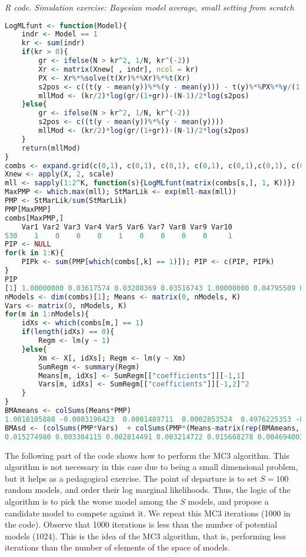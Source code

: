 \begin{tcolorbox}[enhanced,width=4.67in,center upper,
	fontupper=\large\bfseries,drop shadow southwest,sharp corners]
	\textit{R code. Simulation exercise: Bayesian model average, small setting from scratch}
	\begin{VF}
		\begin{lstlisting}[language=R]
LogMLfunt <- function(Model){
	indr <- Model == 1
	kr <- sum(indr)
	if(kr > 0){
		gr <- ifelse(N > kr^2, 1/N, kr^(-2))
		Xr <- matrix(Xnew[ , indr], ncol = kr)
		PX <- Xr%*%solve(t(Xr)%*%Xr)%*%t(Xr)
		s2pos <- c((t(y - mean(y))%*%(y - mean(y))) - t(y)%*%PX%*%y/(1 + gr))
		mllMod <- (kr/2)*log(gr/(1+gr))-(N-1)/2*log(s2pos)
	}else{
		gr <- ifelse(N > kr^2, 1/N, kr^(-2))
		s2pos <- c((t(y - mean(y))%*%(y - mean(y))))
		mllMod <- (kr/2)*log(gr/(1+gr))-(N-1)/2*log(s2pos)
	}
	return(mllMod)
}
combs <- expand.grid(c(0,1), c(0,1), c(0,1), c(0,1), c(0,1),c(0,1), c(0,1), c(0,1), c(0,1), c(0,1))
Xnew <- apply(X, 2, scale)
mll <- sapply(1:2^K, function(s){LogMLfunt(matrix(combs[s,], 1, K))})
MaxPMP <- which.max(mll); StMarLik <- exp(mll-max(mll))
PMP <- StMarLik/sum(StMarLik)
PMP[MaxPMP]
combs[MaxPMP,]
    Var1 Var2 Var3 Var4 Var5 Var6 Var7 Var8 Var9 Var10
530    1    0    0    0    1    0    0    0    0     1
PIP <- NULL
for(k in 1:K){
	PIPk <- sum(PMP[which(combs[,k] == 1)]); PIP <- c(PIP, PIPk)
}
PIP
[1] 1.00000000 0.03617574 0.03208369 0.03516743 1.00000000 0.04795509 0.03457102 0.03468819 0.03510209 1.00000000
nModels <- dim(combs)[1]; Means <- matrix(0, nModels, K)
Vars <- matrix(0, nModels, K)
for(m in 1:nModels){
	idXs <- which(combs[m,] == 1)
	if(length(idXs) == 0){
		Regm <- lm(y ~ 1)
	}else{
		Xm <- X[, idXs]; Regm <- lm(y ~ Xm)
		SumRegm <- summary(Regm)
		Means[m, idXs] <- SumRegm[["coefficients"]][-1,1]
		Vars[m, idXs] <- SumRegm[["coefficients"]][-1,2]^2 
	}
}
BMAmeans <- colSums(Means*PMP)
1.0018105888 -0.0003196423  0.0001489711  0.0002853524  0.4976225353 -0.0007229563  0.0005342718  0.0005441905  0.0005758708 -0.7035206822
BMAsd <- (colSums(PMP*Vars)  + colSums(PMP*(Means-matrix(rep(BMAmeans, each = nModels), nModels, K))^2))^0.5
0.015274980 0.003304115 0.002814491 0.003214722 0.015668278 0.004694003 0.006400541 0.006435695 0.006528471 0.030940753 
\end{lstlisting}
	\end{VF}
\end{tcolorbox} 

The following part of the code shows how to perform the MC3 algorithm. This algorithm is not necessary in this case due to being a small dimensional problem, but it helps as a pedagogical exercise. The point of departure is to set $S=100$ random models, and order their log marginal likelihoods. Thus, the logic of the algorithm is to pick the worse model among the $S$ models, and propose a candidate model to compete against it. We repeat this MC3 iterations (1000 in the code). Observe that 1000 iterations is less than the number of potential models (1024). This is the idea of the MC3 algorithm, that is, performing less iterations than the number of elements of the space of models. 

